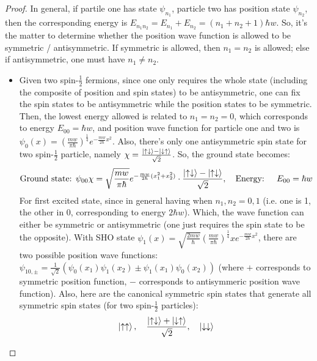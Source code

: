 \documentclass{article}
\begin{document}
\begin{proof}
    
    In general, if partile one has state $\psi_{n_1}$, particle two has position state $\psi_{n_2}$, then the corresponding energy is $E_{n_1n_2} = E_{n_1}+E_{n_2} = (n_1+n_2+1)\hbar w$. So, it's the matter to determine whether the position wave function is allowed to be symmetric / antisymmetric. If symmetric is allowed, then $n_1=n_2$ is allowed; else if antisymmetric, one must have $n_1\neq n_2$.

    \hfil

    \begin{itemize}
        \item[(a)] Given two spin-$\frac{1}{2}$ fermions, since one only requires the whole state (including the composite of position and spin states) to be antisymmetric, one can fix the spin states to be antisymmetric while the position states to be symmetric. Then, the lowest energy allowed is related to $n_1=n_2=0$, which corresponds to energy $E_{00} = \hbar w$, and position wave function for particle one and two is $\psi_0(x) = \left(\frac{mw}{\pi\hbar}\right)^\frac{1}{4}e^{-\frac{mw}{2\hbar}x^2}$. Also, there's only one antisymmetric spin state for two spin-$\frac{1}{2}$ particle, namely $\chi = \frac{\ket{\uparrow\downarrow}-\ket{\downarrow\uparrow}}{\sqrt{2}}$. So, the ground state becomes:
        \begin{align}
            \text{Ground state: }\psi_{00}\chi = \sqrt{\frac{mw}{\pi\hbar}}e^{-\frac{mw}{2\hbar}(x_1^2+x_2^2)} \cdot \frac{\ket{\uparrow\downarrow}-\ket{\uparrow\downarrow}}{\sqrt{2}},\quad\text{Energy: }\quad E_{00} = \hbar w
        \end{align}
        For first excited state, since in general having when ${n_1,n_2} = {0,1}$ (i.e. one is 1, the other in 0, corresponding to energy $2\hbar w$). Which, the wave function can either be symmetric or antisymmetric (one just requires the spin state to be the opposite). With SHO state $\psi_1(x)=\sqrt{\frac{2mw}{\hbar}}\left(\frac{mw}{\pi\hbar}\right)^\frac{1}{4}xe^{-\frac{mw}{2\hbar}x^2}$, there are two possible position wave functions: $\psi_{10,\pm} = \frac{1}{\sqrt{2}}(\psi_0(x_1)\psi_1(x_2)\pm \psi_1(x_1)\psi_0(x_2))$ (where $+$ corresponds to symmetric position function, $-$ corresponds to antisymmeric position wave function). Also, here are the canonical symmetric spin states that generate all symmetric spin states (for two spin-$\frac{1}{2}$ particles):
        \begin{align}
            \ket{\uparrow\uparrow},\quad \frac{\ket{\uparrow\downarrow}+\ket{\downarrow\uparrow}}{\sqrt{2}}, \quad \ket{\downarrow\downarrow}

\end{align}
\end{itemize}
\end{proof}
\end{document}
